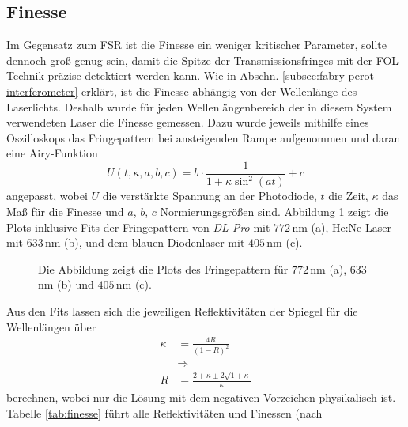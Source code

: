 \subsection{Finesse}\label{subsec:finesse}
Im Gegensatz zum FSR ist die Finesse ein weniger
kritischer Parameter, sollte dennoch groß genug sein, damit die Spitze der
Transmissionsfringes mit der FOL-Technik präzise detektiert werden
kann. Wie in Abschn. \ref{subsec:fabry-perot-interferometer} erklärt, ist
die Finesse abhängig von der Wellenlänge des Laserlichts. Deshalb wurde für jeden
Wellenlängenbereich der in diesem System verwendeten Laser die Finesse
gemessen. Dazu wurde jeweils mithilfe eines Oszilloskops das Fringepattern bei
ansteigenden Rampe aufgenommen und daran eine Airy-Funktion
\begin{equation}\label{eq:finesse_messung_01}
	U(t,\kappa,a,b,c) = b\cdot\frac{1}{1+\kappa \sin^2{(at)}}+c
\end{equation}
angepasst, wobei $U$ die verstärkte Spannung an der Photodiode, $t$ die Zeit,
$\kappa$ das Maß für die Finesse und $a$, $b$, $c$ Normierungsgrößen sind.
Abbildung \ref{fig:finesse_messung} zeigt die Plots inklusive Fits der
Fringepattern von \textit{DL-Pro} mit $772\,$nm (a), He:Ne-Laser mit $633\,$nm (b), und dem
blauen Diodenlaser mit $405\,$nm (c).
\begin{figure}[h]
 	\centering
 	\footnotesize
 	\fbox{\parbox{\dimexpr \linewidth - 2\fboxrule - 2\fboxsep}{
 	\subfloat[]{
		\label{subfig:finesse_messung_a}
		
		}
 	\subfloat[]{
		\label{subfig:finesse_messung_b}
		
		}\\
	\centering
	\subfloat[]{
		\label{subfig:finesse_messung_c}
		
		}
	}}
	\caption[Finesse des FPIs]{Die Abbildung zeigt die Plots des
 	Fringepattern für $772\,$nm (a), $633\,$nm (b) und $405\,$nm (c).}
	\label{fig:finesse_messung}
\end{figure}
Aus den Fits lassen sich die jeweiligen Reflektivitäten der Spiegel für die
Wellenlängen über
\begin{equation}\label{eq:finesse_messung_02}
	\begin{split}
		\kappa&=\frac{4R}{(1-R)^2}\\
		&\Rightarrow\\
		R&=\frac{2+\kappa\pm2\sqrt{1+\kappa}}{\kappa}
	\end{split}	
\end{equation}
berechnen, wobei nur die Lösung mit dem negativen Vorzeichen physikalisch ist.
Tabelle \ref{tab:finesse} führt alle Reflektivitäten und Finessen (nach
